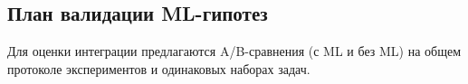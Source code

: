 \documentclass[a4paper,12pt]{extarticle}
\begin{document}
\subsection{План валидации ML-гипотез}
Для оценки интеграции предлагаются A/B-сравнения (с ML и без ML) на общем протоколе экспериментов и одинаковых наборах задач.

\newpage 
\printbibliography[heading=bibintoc] 

	

\end{document}
